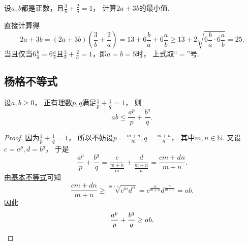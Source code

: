 \begin{example}
设\(a,b\)都是正数，且\(\frac3b+\frac2a=1\)，
计算\(2a+3b\)的最小值.
\begin{solution}
直接计算得\begin{equation*}
	2a+3b
	= (2a+3b) \left( \frac3b+\frac2a \right)  %
	= 13 + 6 \frac{b}{a} + 6 \frac{a}{b}
	\geq 13 + 2 \sqrt{6 \frac{b}{a} \cdot 6 \frac{a}{b}}
	= 25.
\end{equation*}
当且仅当\(6 \frac{b}{a} = 6 \frac{a}{b}\)且\(\frac3b+\frac2a=1\)，即\(a=b=5\)时，
上式取“\(=\)”号.
\end{solution}
\end{example}

\subsection{杨格不等式}
\begin{theorem}[杨格不等式]\label{theorem:不等式.杨格不等式}
设\(a,b\geq0\)，
正有理数\(p,q\)满足\(\frac1p+\frac1q=1\)，
则\begin{equation}
	ab \leq \frac{a^p}{p} + \frac{b^q}{q}.
\end{equation}
\begin{proof}
因为\(\frac1p+\frac1q=1\)，
所以不妨设\(p = \frac{m+n}{m},
q = \frac{m+n}{n}\)，
其中\(m,n\in\mathbb{N}\).
又设\(c=a^p,
d=b^q\)，
于是\begin{equation*}
	\frac{a^p}{p} + \frac{b^q}{q}
	= \frac{c}{\frac{m+n}{m}} + \frac{d}{\frac{m+n}{n}}
	= \frac{cm+dn}{m+n}.
\end{equation*}
由\hyperref[theorem:不等式.基本不等式n几何平均数与算术平均数]{基本不等式}可知\begin{equation*}
	\frac{cm+dn}{m+n}
	\geq \sqrt[m+n]{c^m d^n}
	= c^{\frac{m}{m+n}} d^{\frac{n}{m+n}}
	= a b.
\end{equation*}
因此\begin{equation*}
	\frac{a^p}{p} + \frac{b^q}{q}
	\geq a b.
	\qedhere
\end{equation*}
\end{proof}
\end{theorem}

